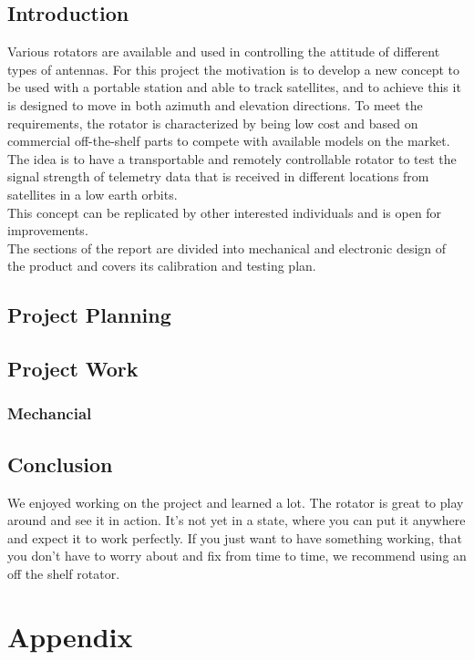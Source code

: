 	\section{Introduction}
Various rotators are available and used in controlling the attitude of different types of antennas. For this project the motivation is to develop a new concept to be used with a portable station and able to track satellites, and to achieve this it is designed to move in both azimuth and elevation directions. To meet the requirements, the rotator is characterized by being low cost and based on commercial off-the-shelf parts to compete with available models on the market. \\
The idea is to have a transportable and remotely controllable rotator to test the signal strength of telemetry data that is received in different locations from satellites in a low earth orbits.\\
This concept can be replicated by other interested individuals and is open for improvements. \\
The sections of the report are divided into mechanical and electronic design of the product and covers its calibration and testing plan.

	\section{Project Planning}
	
	
	\section{Project Work}
	
	\subsection{Mechancial}
	
	
    	
    
	
	
	
	
	
	
	\section{Conclusion}
	We enjoyed working on the project and learned a lot. The rotator is great to play around and see it in action. It's not yet in a state, where you can put it anywhere and expect it to work perfectly. If you just want to have something working, that you don't have to worry about and fix from time to time, we recommend using an off the shelf rotator.
	
	\chapter{Appendix}
	
	\newpage
	






